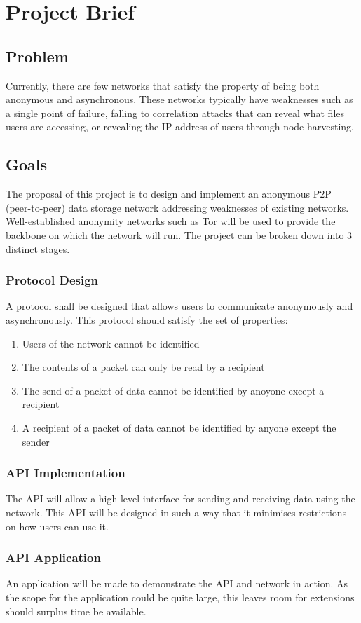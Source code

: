 \justifying
\setlength{\parskip}{0.6\baselineskip}
\setlength{\parindent}{0pt}

\section{Project Brief}

\subsection*{Problem}
Currently, there are few networks that satisfy the property of being both anonymous and asynchronous. These networks typically have weaknesses such as a single point of failure, falling to correlation attacks that can reveal what files users are accessing, or revealing the IP address of users through node harvesting.

\subsection*{Goals}
The proposal of this project is to design and implement an anonymous P2P (peer-to-peer) data storage network addressing weaknesses of existing networks. Well-established anonymity networks such as Tor will be used to provide the backbone on which the network will run.
The project can be broken down into 3 distinct stages.

\subsubsection*{Protocol Design}
A protocol shall be designed that allows users to communicate anonymously and asynchronously. This protocol should satisfy the set of properties:
\begin{enumerate}
	\item Users of the network cannot be identified
	\item The contents of a packet can only be read by a recipient
	\item The send of a packet of data cannot be identified by anoyone except a recipient
	\item A recipient of a packet of data cannot be identified by anyone except the sender
\end{enumerate}
\subsubsection*{API Implementation}
The API will allow a high-level interface for sending and receiving data using the network. This API will be designed in such a way that it minimises restrictions on how users can use it.
\subsubsection*{API Application}
An application will be made to demonstrate the API and network in action. As the scope for the application could be quite large, this leaves room for extensions should surplus time be available.
